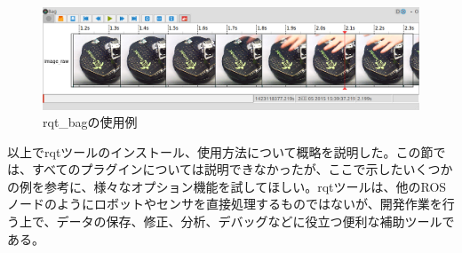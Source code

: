 \begin{figure}[htp]
  \centering
  \includegraphics[width=\columnwidth]{pictures/chapter5/pic_05_13.png}
  \caption{rqt\_bagの使用例}
\end{figure}

以上でrqtツールのインストール、使用方法について概略を説明した。この節では、すべてのプラグインについては説明できなかったが、ここで示したいくつかの例を参考に、様々なオプション機能を試してほしい。rqtツールは、他のROSノードのようにロボットやセンサを直接処理するものではないが、開発作業を行う上で、データの保存、修正、分析、デバッグなどに役立つ便利な補助ツールである。

